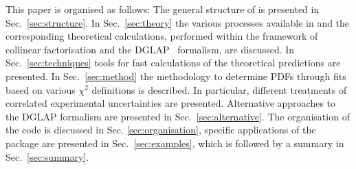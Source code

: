 This paper is organised as follows:
%
The general structure of \fitter is presented in Sec.~\ref{sec:structure}.
In Sec.~\ref{sec:theory} the various processes available in \fitter
and the corresponding theoretical calculations, performed within the framework of collinear factorisation and the DGLAP~\cite{Gribov:1972ri,Gribov:1972rt,Lipatov:1974qm,
Dokshitzer:1977sg,Altarelli:1977zs} formalism, are discussed. In
Sec.~\ref{sec:techniques} tools for fast calculations of the theoretical predictions are presented.
In Sec.~\ref{sec:method} the 
methodology to determine PDFs through fits based on various
 $\chi^2$ definitions is described. In particular, different treatments of correlated experimental uncertainties are presented.
Alternative approaches to the DGLAP formalism are presented in Sec.~\ref{sec:alternative}.
%
The organisation of the \fitter code is discussed in Sec. \ref{sec:organisation}, specific applications 
of the package are presented in Sec.~\ref{sec:examples}, which is followed by a summary in Sec.~\ref{sec:summary}.
%
